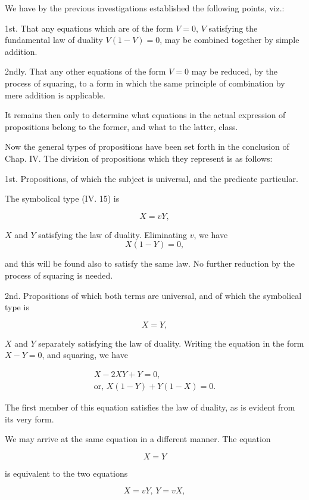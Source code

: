 \documentclass[oneside]{book}
\begin{document}
We have by the previous investigations established the following points, viz.:

1st. That any equations which are of the form $V = 0$, $V$ satisfying
the fundamental law of duality $V(1 - V) = 0$, may be
combined together by simple addition.

2ndly. That any other equations of the form $V = 0$ may be
reduced, by the process of squaring, to a form in which the same
principle of combination by mere addition is applicable.

It remains then only to determine what equations in the actual
expression of propositions belong to the former, and what to
the latter, class.

Now the general types of propositions have been set forth in
the conclusion of Chap. IV. The division of propositions which
they represent is as follows:

1st. Propositions, of which the subject is universal, and the
predicate particular.

The symbolical type (IV. 15) is

\[
X = vY,
\]

$X$ and $Y$ satisfying the law of duality. Eliminating $v$, we have
\setcounter{equation}{0}
\begin{equation}
X(1-Y) = 0,
\end{equation}

and this will be found also to satisfy the same law. No further
reduction by the process of squaring is needed.

2nd. Propositions of which both terms are universal, and of
which the symbolical type is

\[
X = Y,
\]

$X$ and $Y$ separately satisfying the law of duality. Writing the
equation in the form $X - Y = 0$, and squaring, we have

\begin{eqnarray}
X - 2XY + Y = 0,\nonumber\\
\textrm{or, } X(1 - Y) + Y(1- X) = 0.
\end{eqnarray}

The first member of this equation satisfies the law of duality, as
is evident from its very form.

We may arrive at the same equation in a different manner.
The equation

\[
X = Y
\]

is equivalent to the two equations

\[
X = vY\textrm{, }Y = vX,
\]
\end{document}
